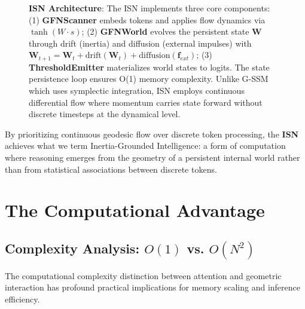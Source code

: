 \documentclass[12pt,a4paper]{article}
\begin{document}
\begin{figure}[!ht]
    \caption{\textbf{ISN Architecture}: The ISN implements three core components: (1) \textbf{GFNScanner} embeds tokens and applies flow dynamics via $\tanh(W \cdot s)$; (2) \textbf{GFNWorld} evolves the persistent state $\mathbf{W}$ through drift (inertia) and diffusion (external impulses) with $\mathbf{W}_{t+1} = \mathbf{W}_t + \text{drift}(\mathbf{W}_t) + \text{diffusion}(\mathbf{f}_{ext})$; (3) \textbf{ThresholdEmitter} materializes world states to logits. The state persistence loop ensures O(1) memory complexity. Unlike G-SSM which uses symplectic integration, ISN employs continuous differential flow where momentum carries state forward without discrete timesteps at the dynamical level.}
    \label{fig:tikz-isn-detailed}
\end{figure}

By prioritizing continuous geodesic flow over discrete token processing, the \textbf{ISN} achieves what we term Inertia-Grounded Intelligence: a form of computation where reasoning emerges from the geometry of a persistent internal world rather than from statistical associations between discrete tokens.

\section{The Computational Advantage}
\label{sec:computational-advantage}

\subsection{Complexity Analysis: $O(1)$ vs. $O(N^2)$}
\label{sec:complexity}

The computational complexity distinction between attention and geometric interaction has profound practical implications for memory scaling and inference efficiency.
\end{document}
